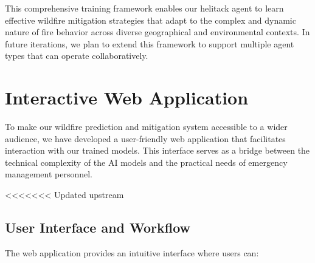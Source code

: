 \documentclass[conference]{IEEEtran}
\begin{document}
\noindent
This comprehensive training framework enables our helitack agent to learn effective wildfire mitigation strategies that adapt to the complex and dynamic nature of fire behavior across diverse geographical and environmental contexts. In future iterations, we plan to extend this framework to support multiple agent types that can operate collaboratively.

\section{Interactive Web Application}

To make our wildfire prediction and mitigation system accessible to a wider audience, we have developed a user-friendly web application that facilitates interaction with our trained models. This interface serves as a bridge between the technical complexity of the AI models and the practical needs of emergency management personnel.

<<<<<<< Updated upstream
\subsection{User Interface and Workflow}
The web application provides an intuitive interface where users can:
\end{document}
